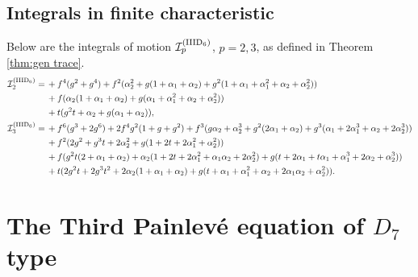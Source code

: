 \documentclass[a4paper,reqno]{amsart}
\numberwithin{equation}{section}
\numberwithin{figure}{section}
\theoremstyle{remark}
\begin{document}
\subsection{Integrals in finite characteristic}
Below are the integrals of motion $\mathcal{I}_p^{(\rm{IIID}_6)}$, $p=2,3$, as defined in Theorem \ref{thm:gen trace}.
\begin{align*}
\mathcal{I}_2^{(\rm{IIID}_6)} =&\,+f^4 (g^2+g^4)+f^2 (\alpha_{2}^2+g (1+\alpha_{1}+\alpha_{2})+g^2 (1+\alpha_{1}+\alpha_{1}^2+\alpha_{2}+\alpha_{2}^2))\\
&\,+f (\alpha_{2} (1+\alpha_{1}+\alpha_{2})+g (\alpha_{1}+\alpha_{1}^2+\alpha_{2}+\alpha_{2}^2)) \\
&\,+t (g^2 t+\alpha_{2}+g (\alpha_{1}+\alpha_{2})) ,\\
\mathcal{I}_3^{(\rm{IIID}_6)} =&\,+f^6 (g^3+2 g^6)+2 f^4 g^2 (1+g+g^2)+f^3 (g \alpha_{2}+\alpha_{2}^3+g^2 (2 \alpha_{1}+\alpha_{2})+g^3 (\alpha_{1}+2 \alpha_{1}^3+\alpha_{2}+2 \alpha_{2}^3))\\
&\,+f^2 (2 g^2+g^3 t+2 \alpha_{2}^2+g (1+2 t+2 \alpha_{1}^2+\alpha_{2}^2))\\
&\,+f (g^2 t (2+\alpha_{1}+\alpha_{2})+\alpha_{2} (1+2 t+2 \alpha_{1}^2+\alpha_{1} \alpha_{2}+2 \alpha_{2}^2)+g (t+2 \alpha_{1}+t \alpha_{1}+\alpha_{1}^3+2 \alpha_{2}+\alpha_{2}^3))\\
&\,+t (2 g^2 t+2 g^3 t^2+2 \alpha_{2} (1+\alpha_{1}+\alpha_{2})+g (t+\alpha_{1}+\alpha_{1}^2+\alpha_{2}+2 \alpha_{1} \alpha_{2}+\alpha_{2}^2)) .
\end{align*}























\section{The Third Painlev\'e equation of $D_7$ type}\label{sect:p3d7}
\end{document}
